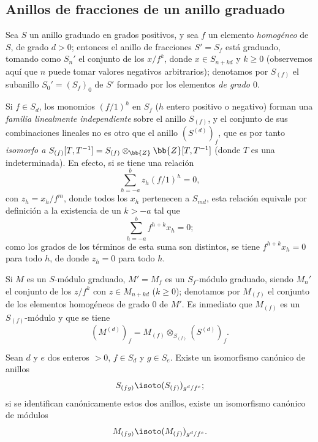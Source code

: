 \documentclass[oneside,10pt]{amsart}
\renewcommand{\geq}{\geqslant}
\newcommand{\oldpage}[2][]{\marginnote{\normalfont\footnotesize\textbf{#1}~|~#2}\ignorespaces}
\let\EGAOriginalLabel\label
\renewcommand{\label}[1]{\phantomsection\EGAOriginalLabel{#1}}
\begin{document}
\subsection{Anillos de fracciones de un anillo graduado}
\label{subsection:II.2.2}

\begin{env}[2.2.1]
\label{II.2.2.1}
Sea $S$ un anillo graduado en grados positivos, y sea $f$ un elemento \emph{homogéneo} de $S$, de grado $d>0$; entonces el anillo de fracciones $S'=S_f$ está graduado, tomando como $S_n'$ el conjunto de los $x/f^k$, donde $x\in S_{n+kd}$ y $k\geq0$ (observemos aquí que $n$ puede tomar valores negativos arbitrarios); denotamos por $S_{(f)}$ el subanillo $S_0'=(S_f)_0$ de $S'$ formado por los elementos \emph{de grado $0$}.

Si $f\in S_d$, los monomios $(f/1)^h$ en $S_f$ ($h$ entero positivo o negativo) forman una \emph{familia linealmente independiente} sobre el anillo $S_{(f)}$, y el conjunto de sus combinaciones lineales no es otro que
\oldpage[II]{24}
el anillo $(S^{(d)})_f$, que es por tanto \emph{isomorfo a $S_{(f)}[T,T^{-1}]=S_{(f)}\otimes_\bb{Z}\bb{Z}[T,T^{-1}]$} (donde $T$ es una indeterminada).
En efecto, si se tiene una relación
\[
  \sum_{h=-a}^{b}z_h(f/1)^h=0,
\]
con $z_h=x_h/f^m$, donde todos los $x_h$ pertenecen a $S_{md}$, esta relación equivale por definición a la existencia de un $k>-a$ tal que
\[
  \sum_{h=-a}^{b}f^{h+k}x_h=0;
\]
como los grados de los términos de esta suma son distintos, se tiene $f^{h+k}x_h=0$ para todo $h$, de donde $z_h=0$ para todo $h$.

Si $M$ es un $S$-módulo graduado, $M'=M_f$ es un $S_f$-módulo graduado, siendo $M_n'$ el conjunto de los $z/f^k$ con $z\in M_{n+kd}$ ($k\geq0$); denotamos por $M_{(f)}$ el conjunto de los elementos homogéneos de grado $0$ de $M'$.
Es inmediato que $M_{(f)}$ es un $S_{(f)}$-módulo y que se tiene
\[
  (M^{(d)})_f=M_{(f)}\otimes_{S_{(f)}}(S^{(d)})_f.
\]
\end{env}

\begin{lemma}[2.2.2]
\label{II.2.2.2}
Sean $d$ y $e$ dos enteros $>0$, $f\in S_d$ y $g\in S_e$.
Existe un isomorfismo canónico de anillos
\[
  S_{(fg)}\isoto(S_{(f)})_{g^d/f^e};
\]
si se identifican canónicamente estos dos anillos, existe un isomorfismo canónico de módulos
\[
  M_{(fg)}\isoto(M_{(f)})_{g^d/f^e}.
\]
\end{lemma}
\end{document}
